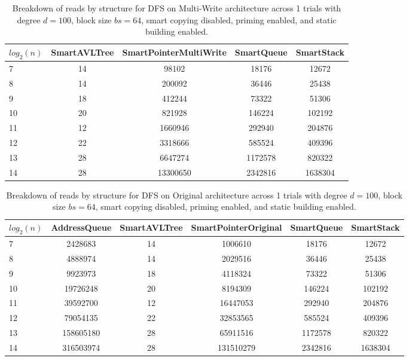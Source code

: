 \begin{table}[]
\centering
\begin{tabular}{|l|c|c|c|c|}
$log_2(n)$ & SmartAVLTree & SmartPointerMultiWrite & SmartQueue & SmartStack \\ \hline
7 & 14 & 98102 & 18176 & 12672 \\ \hline
8 & 14 & 200092 & 36446 & 25438 \\ \hline
9 & 18 & 412244 & 73322 & 51306 \\ \hline
10 & 20 & 821928 & 146224 & 102192 \\ \hline
11 & 12 & 1660946 & 292940 & 204876 \\ \hline
12 & 22 & 3318666 & 585524 & 409396 \\ \hline
13 & 28 & 6647274 & 1172578 & 820322 \\ \hline
14 & 28 & 13300650 & 2342816 & 1638304 \\ \hline
\end{tabular}
\caption{Breakdown of reads by structure for DFS on Multi-Write architecture across 1 trials with degree $d=100$, block size $bs=64$, smart copying disabled, priming enabled, and static building enabled.}
    \label{tab:reads_by_structure_dfs_d100_bs64_trials1_copiesfalse_primetrue_staticinsertiontrue_ptmultiwrite_movetrue}
\end{table}

\begin{table}[]
\centering
\begin{tabular}{|l|c|c|c|c|c|}
$log_2(n)$ & AddressQueue & SmartAVLTree & SmartPointerOriginal & SmartQueue & SmartStack \\ \hline
7 & 2428683 & 14 & 1006610 & 18176 & 12672 \\ \hline
8 & 4888974 & 14 & 2029516 & 36446 & 25438 \\ \hline
9 & 9923973 & 18 & 4118324 & 73322 & 51306 \\ \hline
10 & 19726248 & 20 & 8194309 & 146224 & 102192 \\ \hline
11 & 39592700 & 12 & 16447053 & 292940 & 204876 \\ \hline
12 & 79054135 & 22 & 32853565 & 585524 & 409396 \\ \hline
13 & 158605180 & 28 & 65911516 & 1172578 & 820322 \\ \hline
14 & 316503974 & 28 & 131510279 & 2342816 & 1638304 \\ \hline
\end{tabular}
\caption{Breakdown of reads by structure for DFS on Original architecture across 1 trials with degree $d=100$, block size $bs=64$, smart copying disabled, priming enabled, and static building enabled.}
    \label{tab:reads_by_structure_dfs_d100_bs64_trials1_copiesfalse_primetrue_staticinsertiontrue_ptoriginal_movefalse}
\end{table}

